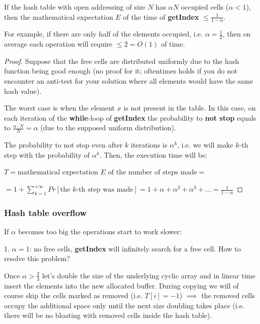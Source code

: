 \begin{lemma}
    If the hash table with open addressing of size $N$ has $\alpha N$ occupied cells ($\alpha < 1$), then the mathematical expectation $E$ of the time of \textbf{getIndex} $\leq \frac{1}{1-\alpha}$.

    For example, if there are only half of the elements occupied, i.e. $\alpha = \frac{1}{2}$, then on average each operation will require $\leq 2 = O(1)$ of time.
\end{lemma}

\begin{proof}

    Suppose that the free cells are distributed uniformly due to the hash function being good enough (no proof for it; oftentimes holds if you do not encounter an anti-test for your solution where all elements would have the same hash value).

    The worst case is when the element $x$ is not present in the table. In this case, on each iteration of the \textbf{while}-loop of \textbf{getIndex} the probability to \textbf{not stop} equals to $\frac{\alpha \cdot N}{N} = \alpha$ (due to the supposed uniform distribution).

    The probability to not stop even after $k$ iterations is $\alpha^k$, i.e. we will make $k$-th step with the probability of $\alpha^k$. Then, the execution time will be:

    $T = \text{mathematical expectation $E$ of the number of steps made} =$

    $= 1 + \sum_{k=1}^{+\infty} Pr[\text{the $k$-th step was made}] = 1 + \alpha + \alpha^2 + \alpha^3 + ... = \frac{1}{1-\alpha} $

\end{proof}

\subsubsection{Hash table overflow}

If $\alpha$ becomes too big the operations start to work slower:

1. $\alpha = 1$: no free cells, \textbf{getIndex} will infinitely search for a free cell. How to resolve this problem?

Once $\alpha > \frac{2}{3}$ let's double the size of the underlying cyclic array and in linear time insert the elements into the new allocated buffer. During copying we will of course skip the cells marked as removed (i.e. $T[i] = -1$) $\implies$ the removed cells occupy the additional space only until the next size doubling takes place (i.e. there will be no bloating with removed cells inside the hash table).

